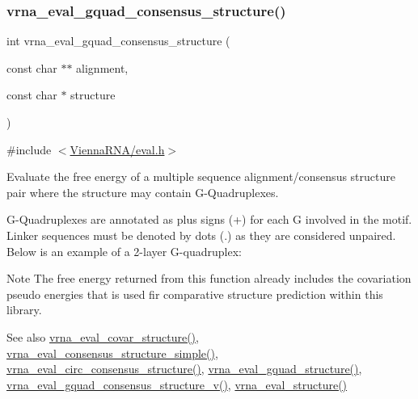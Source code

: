 \subsubsection{\texorpdfstring{vrna\_eval\_gquad\_consensus\_structure()}{vrna\_eval\_gquad\_consensus\_structure()}}
{\footnotesize\ttfamily int vrna\+\_\+eval\+\_\+gquad\+\_\+consensus\+\_\+structure (\begin{DoxyParamCaption}\item[{const char $\ast$$\ast$}]{alignment,  }\item[{const char $\ast$}]{structure }\end{DoxyParamCaption})}



{\ttfamily \#include $<$\mbox{\hyperlink{eval_8h}{Vienna\+R\+N\+A/eval.\+h}}$>$}



Evaluate the free energy of a multiple sequence alignment/consensus structure pair where the structure may contain G-\/\+Quadruplexes. 

G-\/\+Quadruplexes are annotated as plus signs (\textquotesingle{}+\textquotesingle{}) for each G involved in the motif. Linker sequences must be denoted by dots (\textquotesingle{}.\textquotesingle{}) as they are considered unpaired. Below is an example of a 2-\/layer G-\/quadruplex\+: 
\begin{DoxyCode}{0}
\end{DoxyCode}


\begin{DoxyNote}{Note}
The free energy returned from this function already includes the covariation pseudo energies that is used fir comparative structure prediction within this library.
\end{DoxyNote}
\begin{DoxySeeAlso}{See also}
\mbox{\hyperlink{group__eval_ga6cea75c0eb9857fb59172be54cab09e0}{vrna\+\_\+eval\+\_\+covar\+\_\+structure()}}, \mbox{\hyperlink{group__eval_ga7762c3a7bdcbc3a14ef93259d322c7d6}{vrna\+\_\+eval\+\_\+consensus\+\_\+structure\+\_\+simple()}}, \mbox{\hyperlink{group__eval_gac96577cf232c71160f762737a994b7c6}{vrna\+\_\+eval\+\_\+circ\+\_\+consensus\+\_\+structure()}}, \mbox{\hyperlink{group__eval_ga3263504825ef4b523eba797c99921df4}{vrna\+\_\+eval\+\_\+gquad\+\_\+structure()}}, \mbox{\hyperlink{group__eval_ga8abc794fc48d43268ced5e8cde017baa}{vrna\+\_\+eval\+\_\+gquad\+\_\+consensus\+\_\+structure\+\_\+v()}}, \mbox{\hyperlink{group__eval_ga58f199f1438d794a265f3b27fc8ea631}{vrna\+\_\+eval\+\_\+structure()}}
\end{DoxySeeAlso}

